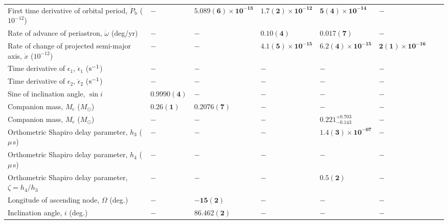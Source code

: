 \begin{table}
\begin{tabular}{llllllll}
First time derivative of orbital period, ${\dot P}_{\mathrm{b}}$ ($10^{-12}$)	 & 	 $\mathbf{ - }$	 & 	 $\mathbf{ 5.089(6)\times 10^{-13} }$	 & 	 $\mathbf{ 1.7(2)\times 10^{-12} }$	 & 	 $\mathbf{ 5(4)\times 10^{-14} }$	 & 	 $\mathbf{ - }$\\ 
Rate of advance of periastron, ${\dot \omega}$ (deg/yr)	 & 	 $\mathbf{ - }$	 & 	 $\mathbf{ - }$	 & 	 $\mathbf{ 0.10(4) }$	 & 	 $\mathbf{ 0.017(7) }$	 & 	 $\mathbf{ - }$\\ 
Rate of change of projected semi-major axis, ${\dot x}$ ($10^{-12}$)	 & 	 $\mathbf{ - }$	 & 	 $\mathbf{ - }$	 & 	 $\mathbf{ 4.1(5)\times 10^{-15} }$	 & 	 $\mathbf{ 6.2(4)\times 10^{-15} }$	 & 	 $\mathbf{ 2(1)\times 10^{-16} }$\\ 
Time derivative of $\epsilon_1$, $\dot{\epsilon}_1$ (${\rm s}^{-1}$)	 & 	 $\mathbf{ - }$	 & 	 $\mathbf{ - }$	 & 	 $\mathbf{ - }$	 & 	 $\mathbf{ - }$	 & 	 $\mathbf{ - }$\\ 
Time derivative of $\epsilon_2$, $\dot{\epsilon}_2$ (${\rm s}^{-1}$)	 & 	 $\mathbf{ - }$	 & 	 $\mathbf{ - }$	 & 	 $\mathbf{ - }$	 & 	 $\mathbf{ - }$	 & 	 $\mathbf{ - }$\\ 
Sine of inclination angle, $\sin i$	 & 	 $\mathbf{ 0.9990(4) }$	 & 	 $\mathbf{ - }$	 & 	 $\mathbf{ - }$	 & 	 $\mathbf{ - }$	 & 	 $\mathbf{ - }$\\ 
Companion mass, $M_{\mathrm{c}}$ ($M_{\odot}$)	 & 	 $\mathbf{ 0.26(1) }$	 & 	 $\mathbf{ 0.2076(7) }$	 & 	 $\mathbf{ - }$	 & 	 $\mathbf{ - }$	 & 	 $\mathbf{ - }$\\ 
Companion mass, $M_{\mathrm{c}}$ ($M_{\odot}$)	 & 	 $-$	 & 	 $-$	 & 	 $-$	 & 	 $0.221^{ +0.703 }_{ -0.143 }$	 & 	 $-$\\ 
Orthometric Shapiro delay parameter, $h_3$ ($\mu\,$s)	 & 	 $\mathbf{ - }$	 & 	 $\mathbf{ - }$	 & 	 $\mathbf{ - }$	 & 	 $\mathbf{ 1.4(3)\times 10^{-07} }$	 & 	 $\mathbf{ - }$\\ 
Orthometric Shapiro delay parameter, $h_4$ ($\mu\,$s)	 & 	 $\mathbf{ - }$	 & 	 $\mathbf{ - }$	 & 	 $\mathbf{ - }$	 & 	 $\mathbf{ - }$	 & 	 $\mathbf{ - }$\\ 
Orthometric Shapiro delay parameter, $\zeta = h_4 / h_3$	 & 	 $\mathbf{ - }$	 & 	 $\mathbf{ - }$	 & 	 $\mathbf{ - }$	 & 	 $\mathbf{ 0.5(2) }$	 & 	 $\mathbf{ - }$\\ 
Longitude of ascending node, $\Omega$ (deg.)	 & 	 $\mathbf{ - }$	 & 	 $\mathbf{ -15(2) }$	 & 	 $\mathbf{ - }$	 & 	 $\mathbf{ - }$	 & 	 $\mathbf{ - }$\\ 
Inclination angle, $i$ (deg.)	 & 	 $\mathbf{ - }$	 & 	 $\mathbf{ 86.462(2) }$	 & 	 $\mathbf{ - }$	 & 	 $\mathbf{ - }$	 & 	 $\mathbf{ - }$\\ 

\end{tabular}
\end{table}

